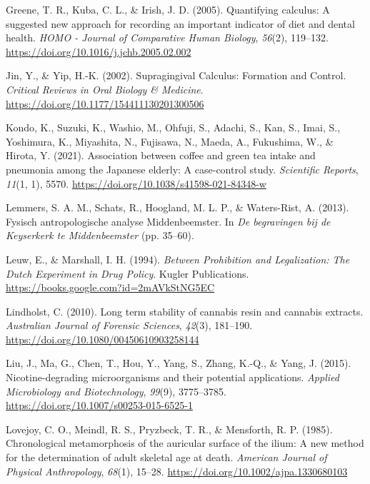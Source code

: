 \documentclass[
  letterpaper,
]{book}
\newlength{\cslhangindent}
\newlength{\cslentryspacingunit} %
\newenvironment{CSLReferences}[2] %
 {%
  \setlength{\parindent}{0pt}
  \ifodd #1
  \let\oldpar\par
  \def\par{\hangindent=\cslhangindent\oldpar}
  \fi
  \setlength{\parskip}{#2\cslentryspacingunit}
 }%
 {}
\begin{document}
\begin{CSLReferences}{1}{0}
\leavevmode{}%
Greene, T. R., Kuba, C. L., \& Irish, J. D. (2005). Quantifying
calculus: {A} suggested new approach for recording an important
indicator of diet and dental health. \emph{HOMO - Journal of Comparative
Human Biology}, \emph{56}(2), 119--132.
\url{https://doi.org/10.1016/j.jchb.2005.02.002}

\leavevmode{}%
Jin, Y., \& Yip, H.-K. (2002). Supragingival {Calculus}: {Formation} and
{Control}. \emph{Critical Reviews in Oral Biology \& Medicine}.
\url{https://doi.org/10.1177/154411130201300506}

\leavevmode{}%
Kondo, K., Suzuki, K., Washio, M., Ohfuji, S., Adachi, S., Kan, S.,
Imai, S., Yoshimura, K., Miyashita, N., Fujisawa, N., Maeda, A.,
Fukushima, W., \& Hirota, Y. (2021). Association between coffee and
green tea intake and pneumonia among the {Japanese} elderly: A
case-control study. \emph{Scientific Reports}, \emph{11}(1, 1), 5570.
\url{https://doi.org/10.1038/s41598-021-84348-w}

\leavevmode{}%
Lemmers, S. A. M., Schats, R., Hoogland, M. L. P., \& Waters-Rist, A.
(2013). Fysisch antropologische analyse Middenbeemster. In \emph{De
begravingen bij de Keyserkerk te Middenbeemster} (pp. 35--60).

\leavevmode{}%
Leuw, E., \& Marshall, I. H. (1994). \emph{Between {Prohibition} and
{Legalization}: {The Dutch Experiment} in {Drug Policy}}. {Kugler
Publications}. \url{https://books.google.com?id=2mAVkStNG5EC}

\leavevmode{}%
Lindholst, C. (2010). Long term stability of cannabis resin and cannabis
extracts. \emph{Australian Journal of Forensic Sciences}, \emph{42}(3),
181--190. \url{https://doi.org/10.1080/00450610903258144}

\leavevmode{}%
Liu, J., Ma, G., Chen, T., Hou, Y., Yang, S., Zhang, K.-Q., \& Yang, J.
(2015). Nicotine-degrading microorganisms and their potential
applications. \emph{Applied Microbiology and Biotechnology},
\emph{99}(9), 3775--3785.
\url{https://doi.org/10.1007/s00253-015-6525-1}

\leavevmode{}%
Lovejoy, C. O., Meindl, R. S., Pryzbeck, T. R., \& Mensforth, R. P.
(1985). Chronological metamorphosis of the auricular surface of the
ilium: {A} new method for the determination of adult skeletal age at
death. \emph{American Journal of Physical Anthropology}, \emph{68}(1),
15--28. \url{https://doi.org/10.1002/ajpa.1330680103}


\end{CSLReferences}
\end{document}
